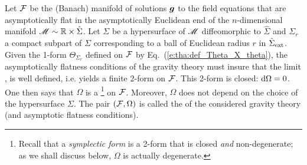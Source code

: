 \begin{prop}
\label{p:tha:presymplectic_form}
Let $\mathcal{F}$ be the (Banach) manifold of solutions $\bm{g}$ to the field equations
that are asymptotically flat in the asymptotically Euclidean end of the
$n$-dimensional manifold $\mathscr{M} \sim \mathbb{R} \times \hat{\Sigma}$. Let
$\Sigma$ be a hypersurface of $\mathscr{M}$ diffeomorphic to $\hat{\Sigma}$
and $\Sigma_r$ a compact subpart
of $\Sigma$ corresponding to a ball of Euclidean radius $r$
in $\hat{\Sigma}_{\rm ext}$.
Given the 1-form $\Theta_{\Sigma_r}$ defined on $\mathcal{F}$ by Eq.~(\ref{e:tha:def_Theta_X_theta}),
the asymptotically flatness conditions of the gravity theory must insure that the limit
\be \label{e:tha:def_Omega_gravity}
   ,
\ee
is well defined, i.e. yields a finite 2-form on $\mathcal{F}$. This 2-form is closed:
$\mathrm{d}\Omega = 0$. One then says that $\Omega$ is a
\footnote{Recall that a \emph{symplectic form} is a 2-form that is closed \emph{and} non-degenerate; as we shall discuss
below, $\Omega$ is actually degenerate.} on $\mathcal{F}$.
Moreover, $\Omega$ does not depend on the choice of the hypersurface $\Sigma$.
The pair $(\mathcal{F},\Omega)$ is called the  of the considered gravity theory
(and asymptotic flatness conditions).
\end{prop}

